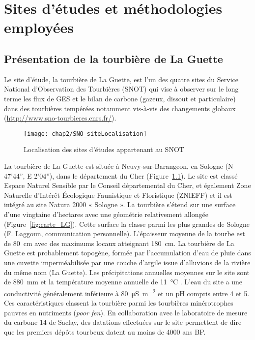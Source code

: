 \singlespacing
\chapter{Sites d'études et méthodologies employées}
\label{ch:ch2}

\minitoc

\newpage
\doublespacing
\section{Présentation de la tourbière de La Guette}

Le site d'étude, la tourbière de La Guette, est l'un des quatre sites du Service National d'Observation des Tourbières (SNOT) qui vise à observer sur le long terme les flux de GES et le bilan de carbone (gazeux, dissout et particulaire) dans des tourbières tempérées notamment vis-à-vis des changements globaux (\url{http://www.sno-tourbieres.cnrs.fr/}).

\begin{figure}[h]
\centering
\texttt{[image: chap2/SNO\_siteLocalisation]}
\caption{Localisation des sites d'études appartenant au SNOT}
\label{fig:carte_europe}
\end{figure}

La tourbière de La Guette est située à Neuvy-sur-Barangeon, en Sologne (N 47’44”, E 2’04”), dans le département du Cher (Figure~\ref{fig:carte_europe}).
Le site est classé Espace Naturel Sensible par le Conseil départemental du Cher, et également Zone Naturelle d'Intérêt Écologique Faunistique et Floristique (ZNIEFF) et il est intégré au site Natura 2000 « Sologne ».
La tourbière s'étend sur une surface d'une vingtaine d'hectares avec une géométrie relativement allongée (Figure~\ref{fig:carte_LG}).
Cette surface la classe parmi les plus grandes de Sologne (F. Laggoun, communication personnelle).
L'épaisseur moyenne de la tourbe est de \SI{80}{\centi\metre} avec des maximums locaux atteignant \SI{180}{\centi\metre}.
La tourbière de La Guette est probablement topogène, formée par l'accumulation d'eau de pluie dans une cuvette imperméabilisée par une couche d'argile issue d'alluvions de la rivière du même nom (La Guette).
Les précipitations annuelles moyennes sur le site sont de \SI{880}{\milli\metre} et la température moyenne annuelle de \SI{11}{\degreeCelsius} \citep{gogo2011}.
L'eau du site a une conductivité généralement inférieure à \SI{80}{\micro\siemens\per\square\metre} et un pH compris entre 4 et 5.
Ces caractéristiques classent la tourbière parmi les tourbières minérotrophes pauvres en nutriments (\textit{poor fen}).
En collaboration avec le laboratoire de mesure du carbone 14 de Saclay, des datations effectuées sur le site permettent de dire que les premiers dépôts tourbeux datent au moins de \num{4000} ans BP.

